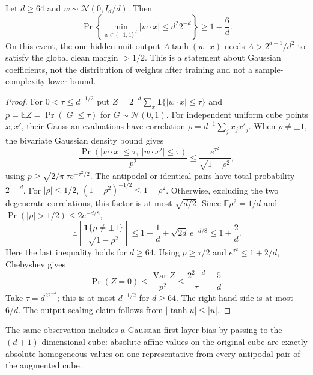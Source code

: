 \begin{proposition}
Let $d\ge64$ and $w\sim\mathcal N(0,I_d/d)$. Then
\[
 \Pr\left\{\min_{x\in\{-1,1\}^d}|w\cdot x|
                    \le d^2 2^{-d}\right\}\ge1-\frac6d.
\]
On this event, the one-hidden-unit output $A\tanh(w\cdot x)$ needs
$A>2^{d-1}/d^2$ to satisfy the global clean margin $>1/2$.
This is a statement about Gaussian coefficients, not the distribution of
weights after training and not a sample-complexity lower bound.
\end{proposition}
\begin{proof}
For $0<\tau\le d^{-1/2}$ put
$Z=2^{-d}\sum_x\mathbf1\{|w\cdot x|\le\tau\}$ and
$p=\mathbb EZ=\Pr(|G|\le\tau)$ for $G\sim\mathcal N(0,1)$.
For independent uniform cube points $x,x'$, their Gaussian evaluations
have correlation $\rho=d^{-1}\sum_jx_jx'_j$.
When $\rho\ne\pm1$, the bivariate Gaussian density bound gives
\[
 \frac{\Pr(|w\cdot x|\le\tau,\ |w\cdot x'|\le\tau)}{p^2}
 \le\frac{e^{\tau^2}}{\sqrt{1-\rho^2}},
\]
using $p\ge\sqrt{2/\pi}\,\tau e^{-\tau^2/2}$.
The antipodal or identical pairs have total probability $2^{1-d}$.
For $|\rho|\le1/2$, $(1-\rho^2)^{-1/2}\le1+\rho^2$.
Otherwise, excluding the two degenerate correlations, this factor is at
most $\sqrt{d/2}$. Since $\mathbb E\rho^2=1/d$ and
$\Pr(|\rho|>1/2)\le2e^{-d/8}$,
\[
 \mathbb E\!\left[
   \frac{\mathbf1\{\rho\ne\pm1\}}{\sqrt{1-\rho^2}}\right]
 \le1+\frac1d+\sqrt{2d}\,e^{-d/8}\le1+\frac2d.
\]
Here the last inequality holds for $d\ge64$.
Using $p\ge\tau/2$ and $e^{\tau^2}\le1+2/d$, Chebyshev gives
\[
 \Pr(Z=0)\le\frac{\operatorname{Var}Z}{p^2}
 \le\frac{2^{2-d}}\tau+\frac5d.
\]
Take $\tau=d^22^{-d}$; this is at most $d^{-1/2}$ for $d\ge64$.
The right-hand side is at most $6/d$. The output-scaling claim follows
from $|\tanh u|\le|u|$.
\end{proof}

The same observation includes a Gaussian first-layer bias by passing to
the $(d+1)$-dimensional cube: absolute affine values on the original cube
are exactly absolute homogeneous values on one representative from every
antipodal pair of the augmented cube.
